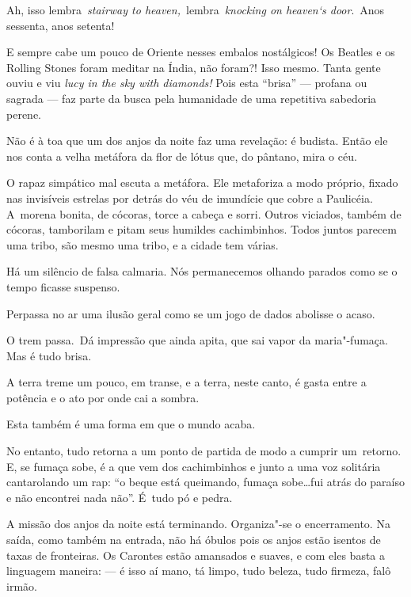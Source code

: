 Ah, isso lembra~\emph{stairway to heaven,}~lembra~\emph{knocking on
heaven`s door}.~Anos sessenta, anos setenta!

E sempre cabe um pouco de Oriente nesses embalos nostálgicos! Os Beatles
e os Rolling Stones foram meditar na Índia, não foram?! Isso mesmo.
Tanta gente ouviu e viu \emph{lucy in the sky with diamonds!} Pois esta
``brisa'' --- profana ou sagrada --- faz parte da busca pela humanidade
de uma repetitiva sabedoria perene.

Não é à toa que um dos anjos da noite faz uma revelação: é budista.
Então ele nos conta a velha metáfora da flor de lótus que, do pântano,
mira o céu.

O rapaz simpático mal escuta a metáfora. Ele metaforiza a modo próprio,
fixado nas invisíveis estrelas por detrás do véu de imundície que cobre
a Paulicéia. A~morena bonita, de cócoras, torce a cabeça e sorri. Outros
viciados, também de cócoras, tamborilam e pitam seus humildes
cachimbinhos. Todos juntos parecem uma tribo, são mesmo uma tribo, e a
cidade tem várias.

 

Há um silêncio de falsa calmaria. Nós permanecemos olhando parados como
se o tempo ficasse suspenso.

 

Perpassa no ar uma ilusão geral como se um jogo de dados abolisse o
acaso.

 

O trem passa.~Dá impressão que ainda apita, que sai vapor da
maria"-fumaça. Mas é tudo brisa.

 

A terra treme um pouco, em transe, e a terra, neste canto, é gasta entre
a potência e o ato por onde cai a sombra.

 

Esta também é uma forma em que o mundo acaba.

 

No entanto, tudo retorna a um ponto de partida de modo a cumprir
um~retorno. E, se fumaça sobe, é a que vem dos cachimbinhos e junto a
uma voz solitária cantarolando um rap: ``o beque está queimando, fumaça
sobe…fui atrás do paraíso e não encontrei nada não''. É~tudo pó e
pedra.

 

A missão dos anjos da noite está terminando. Organiza"-se o encerramento.
Na saída, como também na entrada, não há óbulos pois os anjos estão
isentos de taxas de fronteiras. Os Carontes estão amansados e suaves, e
com eles basta a linguagem maneira: --- é isso aí mano, tá limpo, tudo
beleza, tudo firmeza, falô irmão.

